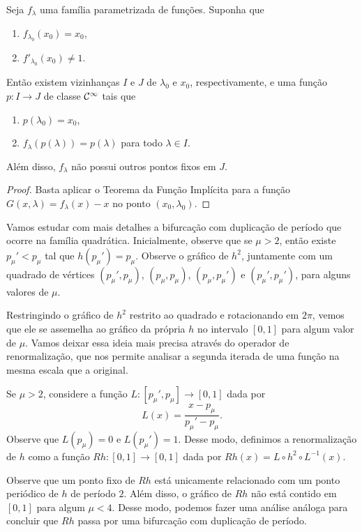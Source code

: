 \begin{theorem}\label{theorem1}
Seja $f_\lambda$ uma família parametrizada de funções.
Suponha que
\begin{enumerate}
\item $f_{\lambda_0}(x_0) = x_0$,
\item $f'_{\lambda_0}(x_0) \neq 1$. 
\end{enumerate}
Então existem vizinhanças $I$ e $J$ de $\lambda_0$ e $x_0$, respectivamente, e uma função $p: I \to J$ de classe $\mathcal{C}^\infty$ tais que
\begin{enumerate}
\item $p(\lambda_0) = x_0$, 
\item $f_\lambda(p(\lambda)) = p(\lambda)$ para todo $\lambda \in I$.
\end{enumerate}
Além disso, $f_\lambda$ não possui outros pontos fixos em $J$.
\end{theorem}

\begin{proof}
Basta aplicar o Teorema da Função Implícita para a função $G(x, \lambda) = f_\lambda(x) - x$ no ponto $(x_0, \lambda_0)$.
\end{proof}

Vamos estudar com mais detalhes a bifurcação com duplicação de período que ocorre na família quadrática.
Inicialmente, observe que se $\mu > 2$, então existe $p_\mu' < p_\mu$ tal que $h(p_\mu') = p_\mu$.
Observe o gráfico de $h^2$, juntamente com um quadrado de vértices $(p_\mu', p_\mu)$, $(p_\mu, p_\mu)$, $(p_\mu, p_\mu')$ e $(p_\mu', p_\mu')$, para alguns valores de $\mu$.

Restringindo o gráfico de $h^2$ restrito ao quadrado e rotacionando em $2 \pi$, vemos que ele se assemelha ao gráfico da própria $h$ no intervalo $[0, 1]$ para algum valor de $\mu$. Vamos deixar essa ideia mais precisa através do operador de renormalização, que nos permite analisar a segunda iterada de uma função na mesma escala que a original.

Se $\mu > 2$, considere a função $L: [p_\mu', p_\mu] \to [0, 1]$ dada por
$$L(x) = \frac{x - p_\mu}{p_\mu' - p_\mu}.$$
Observe que $L(p_\mu) = 0$ e $L(p_\mu') = 1$. Desse modo, definimos a renormalização de $h$ como a função $Rh: [0, 1] \to [0, 1]$ dada por $Rh(x) = L \circ h^2 \circ L^{-1}(x)$.

Observe que um ponto fixo de $Rh$ está unicamente relacionado com um ponto periódico de $h$ de período $2$. Além disso, o gráfico de $Rh$ não está contido em $[0, 1]$ para algum $\mu < 4$. Desse modo, podemos fazer uma análise análoga para concluir que $Rh$ passa por uma bifurcação com duplicação de período. 

